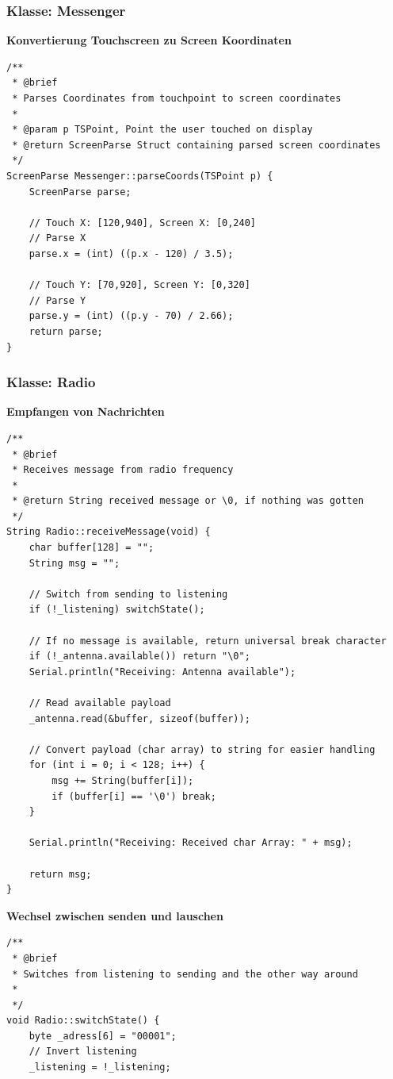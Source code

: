 \documentclass[a4paper, 11pt]{scrartcl}
\begin{document}
\begin{small}
\subsubsection{Klasse: Messenger}
\textbf{Konvertierung Touchscreen zu Screen Koordinaten}\label{code:screenparse}
\begin{lstlisting}
/**
 * @brief 
 * Parses Coordinates from touchpoint to screen coordinates
 * 
 * @param p TSPoint, Point the user touched on display
 * @return ScreenParse Struct containing parsed screen coordinates
 */
ScreenParse Messenger::parseCoords(TSPoint p) {
    ScreenParse parse;
    
    // Touch X: [120,940], Screen X: [0,240]
    // Parse X
    parse.x = (int) ((p.x - 120) / 3.5);

    // Touch Y: [70,920], Screen Y: [0,320]
    // Parse Y
    parse.y = (int) ((p.y - 70) / 2.66);
    return parse;
}
\end{lstlisting}

\subsubsection{Klasse: Radio}
\textbf{Empfangen von Nachrichten}\label{code:receive}
\begin{lstlisting}
/**
 * @brief 
 * Receives message from radio frequency
 * 
 * @return String received message or \0, if nothing was gotten
 */
String Radio::receiveMessage(void) {
    char buffer[128] = "";
    String msg = "";

    // Switch from sending to listening
    if (!_listening) switchState();

    // If no message is available, return universal break character
    if (!_antenna.available()) return "\0";
    Serial.println("Receiving: Antenna available");

    // Read available payload
    _antenna.read(&buffer, sizeof(buffer));

    // Convert payload (char array) to string for easier handling
    for (int i = 0; i < 128; i++) {
        msg += String(buffer[i]);
        if (buffer[i] == '\0') break;
    }

    Serial.println("Receiving: Received char Array: " + msg);

    return msg;
}
\end{lstlisting}

\begin{flushright}\textbf{Wechsel zwischen senden und lauschen}\label{code:switch}\end{flushright}
\begin{lstlisting}
/**
 * @brief 
 * Switches from listening to sending and the other way around
 * 
 */
void Radio::switchState() {
    byte _adress[6] = "00001";
    // Invert listening
    _listening = !_listening;


\end{lstlisting}
\end{small}
\end{document}
